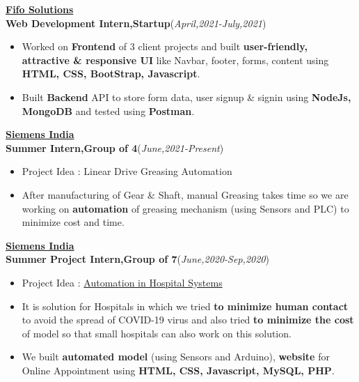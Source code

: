 \documentclass[10pt]{extarticle}
\begin{document}
\vspace{-2pt}
\href{https://drive.google.com/file/d/1ZZzuJxP1OyiecL0BZuU6KvYqN18swkwS/view?usp=sharing}{\textbf{Fifo Solutions}}\\
\textbf{Web Development Intern,Startup}\hfill\hfill(\textit{April,2021-July,2021})
    \begin{itemize}
        \item Worked on \textbf{Frontend} of 3 client projects and built \textbf{user-friendly, attractive \& responsive UI} like Navbar, footer, forms, content using \textbf{HTML, CSS, BootStrap, Javascript}.
        \item Built \textbf{Backend} API to store form data, user signup \& signin using \textbf{NodeJs, MongoDB} and tested using \textbf{Postman}.
    \end{itemize}
\vspace{3pt}
\href{http://www.siemens.com/}{\textbf{Siemens India}}\\
\textbf{Summer Intern,Group of 4}\hfill\hfill(\textit{June,2021-Present})
     \begin{itemize}
         \item Project Idea : Linear Drive Greasing Automation
         \item After manufacturing of Gear \& Shaft, manual Greasing takes time so we are working on \textbf{automation} of greasing mechanism (using Sensors and PLC) to minimize cost and time.
     \end{itemize}
\vspace{3pt}
\href{https://drive.google.com/file/d/11Zo1hU3lB8NY-Y8Fw1PP3Qvl0AB8fPBY/view?usp=sharing}{\textbf{Siemens India}}\\
\textbf{Summer Project Intern,Group of 7}\hfill\hfill(\textit{June,2020-Sep,2020})
      \begin{itemize}
          \item Project Idea : \href{https://github.com/PSoni8/Automation-in-Hospital-Systems}{Automation in Hospital Systems}
          \item It is solution for Hospitals in which we tried \textbf{to minimize human contact} to avoid the spread of COVID-19 virus and also tried \textbf{to minimize the cost} of model so that small hospitals can also work on this solution.
          \item We built \textbf{automated model} (using Sensors and Arduino), \textbf{website} for Online Appointment using \textbf{HTML, CSS, Javascript, MySQL, PHP}.
      \end{itemize}
\end{document}
